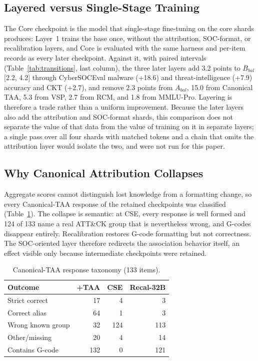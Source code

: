 \documentclass[conference]{IEEEtran}
\begin{document}
\subsection{Layered versus Single-Stage Training}\label{sec:singlestage}
The Core checkpoint is the model that single-stage fine-tuning on the core shards produces: Layer~1 trains the base once, without the attribution, SOC-format, or recalibration layers, and Core is evaluated with the same harness and per-item records as every later checkpoint. Against it, with paired intervals (Table~\ref{tab:transitions}, last column), the three later layers add 3.2 points to $B_{bal}$ [2.2, 4.2] through CyberSOCEval malware (+18.6) and threat-intelligence (+7.9) accuracy and CKT (+2.7), and remove 2.3 points from $A_{bal}$, 15.0 from Canonical TAA, 5.3 from VSP, 2.7 from RCM, and 1.8 from MMLU-Pro. Layering is therefore a trade rather than a uniform improvement. Because the later layers also add the attribution and SOC-format shards, this comparison does not separate the value of that data from the value of training on it in separate layers; a single pass over all four shards with matched tokens and a chain that omits the attribution layer would isolate the two, and were not run for this paper.

\subsection{Why Canonical Attribution Collapses}
Aggregate scores cannot distinguish lost knowledge from a formatting change, so every Canonical-TAA response of the retained checkpoints was classified (Table~\ref{tab:taaerrors}). The collapse is semantic: at CSE, every response is well formed and 124 of 133 name a real ATT\&CK group that is nevertheless wrong, and G-codes disappear entirely. Recalibration restores G-code formatting but not correctness. The SOC-oriented layer therefore redirects the association behavior itself, an effect visible only because intermediate checkpoints were retained.

\begin{table}[t]
\caption{Canonical-TAA response taxonomy (133 items).}
\label{tab:taaerrors}
\centering
\footnotesize
\setlength{\tabcolsep}{2.7pt}
\begin{tabular}{@{}lrrr@{}}
\toprule
Outcome & +TAA & CSE & Recal-32B \\
\midrule
Strict correct & 17 & 4 & 3 \\
Correct alias & 64 & 1 & 3 \\
Wrong known group & 32 & 124 & 113 \\
Other/missing & 20 & 4 & 14 \\
Contains G-code & 132 & 0 & 121 \\
\bottomrule
\end{tabular}
\end{table}
\end{document}
